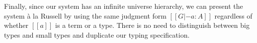 \documentclass[acmsmall]{acmart}
\newcommand{\lang}{$\lambda^H$\xspace}
\begin{document}
Finally, since our system has an infinite universe hierarchy, we can
present the system à la Russell by using the same judgment form $[[G
|- a : A]]$ regardless of whether $[[a]]$ is a term or a type. There
is no need to distinguish between big types and small types
and duplicate our typing specification.














\end{document}
